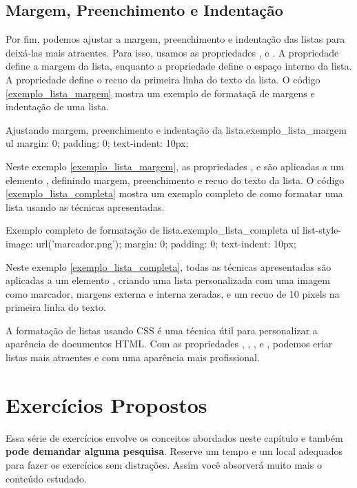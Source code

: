 \subsection{Margem, Preenchimento e Indentação}

Por fim, podemos ajustar a margem, preenchimento e indentação das listas para deixá-las mais atraentes. Para isso, usamos as propriedades ,  e . A propriedade  define a margem da lista, enquanto a propriedade  define o espaço interno da lista. A propriedade  define o recuo da primeira linha do texto da lista. O código \ref{exemplo_lista_margem} mostra um exemplo de formataçã de margens e indentação de uma lista.

\begin{csscode}{Ajustando margem, preenchimento e indentação da lista.}{exemplo_lista_margem}
ul {
    margin: 0;
    padding: 0;
    text-indent: 10px;
}
\end{csscode}

Neste exemplo \ref{exemplo_lista_margem}, as propriedades ,  e  são aplicadas a um elemento , definindo margem, preenchimento e recuo do texto da lista. O código \ref{exemplo_lista_completa} mostra um exemplo completo de como formatar uma lista usando as técnicas apresentadas.

\begin{csscode}{Exemplo completo de formatação de lista.}{exemplo_lista_completa}
ul {    
    list-style-image: url('marcador.png');
    margin: 0;
    padding: 0;
    text-indent: 10px;
}
\end{csscode}

Neste exemplo \ref{exemplo_lista_completa}, todas as técnicas apresentadas são aplicadas a um elemento , criando uma lista personalizada com uma imagem como marcador, margens externa e interna zeradas, e um recuo de 10 pixels na primeira linha do texto.

A formatação de listas usando CSS é uma técnica útil para personalizar a aparência de documentos HTML. Com as propriedades , , ,  e , podemos criar listas mais atraentes e com uma aparência mais profissional.

\section{Exercícios Propostos}

Essa série de exercícios envolve os conceitos abordados neste capítulo e também \textbf{pode demandar alguma pesquisa}. Reserve um tempo e um local adequados para fazer os exercícios sem distrações. Assim você absorverá muito mais o conteúdo estudado.